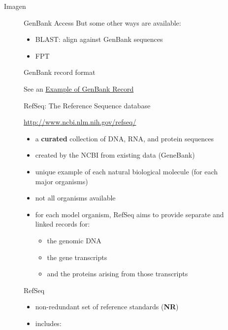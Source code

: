 \begin{frame}{Imagen}
\begin{figure}[htbp]
\begin{frame}{GenBank Access}
But some other ways are available:

\begin{itemize}
\itemsep1pt\parskip0pt
\item
  BLAST: align against GenBank sequences
\item
  FPT
\end{itemize}

\end{frame}

\begin{frame}{GenBank record format}

See an
\href{http://www.ncbi.nlm.nih.gov/Sitemap/samplerecord.html}{Example of
GenBank Record}

\end{frame}

\begin{frame}{RefSeq: The Reference Sequence database}

\url{http://www.ncbi.nlm.nih.gov/refseq/}

\begin{itemize}
\itemsep1pt\parskip0pt
\item
  a \textbf{curated} collection of DNA, RNA, and protein sequences
\item
  created by the NCBI from existing data (GeneBank)
\item
  unique example of each natural biological molecule (for each major
  organisms)
\item
  not all organisms available
\item
  for each model organism, RefSeq aims to provide separate and linked
  records for:

  \begin{itemize}
  \itemsep1pt\parskip0pt
  \item
    the genomic DNA
  \item
    the gene transcripts
  \item
    and the proteins arising from those transcripts
  \end{itemize}
\end{itemize}

\end{frame}

\begin{frame}{RefSeq}

\begin{itemize}
\item
  non-redundant set of reference standards (\textbf{NR})
\item
  includes:


\end{itemize}
\end{frame}
\end{figure}
\end{frame}
